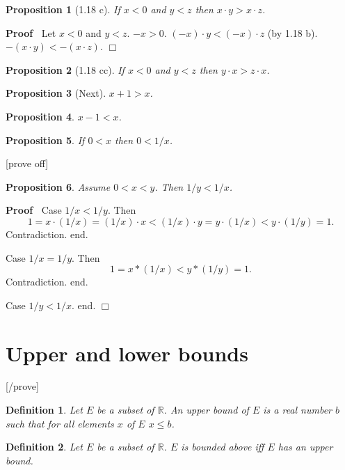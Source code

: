 \documentclass{article}
\newenvironment{forthel}{\begin{leftbar}}{\end{leftbar}}
\newenvironment{proof}{\noindent\textbf{Proof\ }}{\hspace*{\fill}$\Box$\medskip}
\newtheorem{definition}{Definition}
\newtheorem{proposition}{Proposition}
\begin{document}
\begin{forthel}
\begin{proposition}[1.18 c] If $x < 0$ and $y < z$ then 
$x \cdot y > x \cdot z$.\end{proposition}
\begin{proof} Let $x < 0$ and $y < z$.
$-x > 0$.
$(-x)\cdot y < (-x)\cdot z$ (by 1.18 b).
$-(x\cdot y) < -(x\cdot z)$.
\end{proof}

\begin{proposition}[1.18 cc] If $x < 0$ and $y < z$ then 
$y \cdot x > z \cdot x$.\end{proposition}

\begin{proposition}[Next] $x + 1 > x$.\end{proposition}
\begin{proposition} $x - 1 < x$. \end{proposition}


\begin{proposition} If $0 < x$ then $0 < 1/x$.
\end{proposition}
[prove off]

\begin{proposition} Assume $0 < x < y$. Then $1/y < 1/x$.
\end{proposition}
\begin{proof} 
Case $1/x < 1/y$. Then
$$1 = x \cdot (1/x) = (1/x) \cdot x < (1/x) \cdot y = 
y \cdot (1/x) < y \cdot (1/y) = 1.$$ 
Contradiction. end.

Case $1/x = 1/y$. Then
$$1 = x * (1/x) < y * (1/y) = 1.$$ 
Contradiction. end.

Case $1/y < 1/x$. end.
\end{proof}

\section{Upper and lower bounds}

[/prove]

\begin{definition} Let $E$ be a subset of $\mathbb{R}$. 
An \emph{upper bound} of $E$ is a
real number $b$ such that for all elements $x$ of $E$ $x \leq b$.
\end{definition}

\begin{definition} Let $E$ be a subset of $\mathbb{R}$. $E$ is 
\emph{bounded above} iff
$E$ has an upper bound.\end{definition}


\end{forthel}
\end{document}
